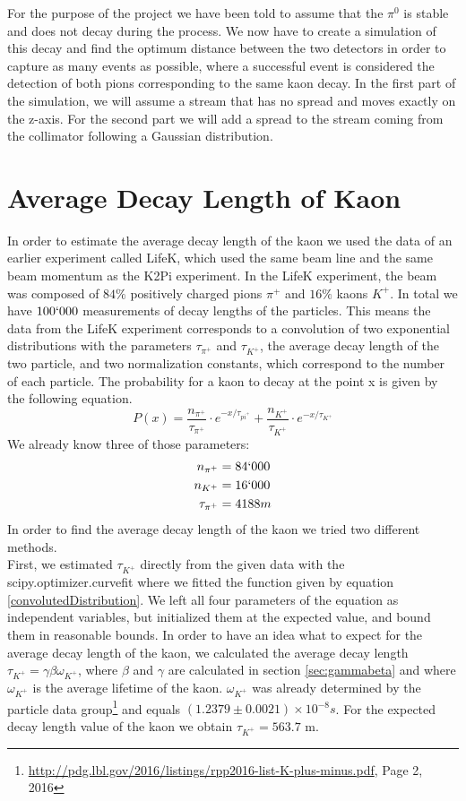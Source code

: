 \documentclass[a4paper,parskip,11pt, DIV12]{scrreprt}
\begin{document}
	For the purpose of the project we have been told to assume that the $\pi^0$ is stable and does not decay during the process. We now have to create a simulation of this decay and find the optimum distance between the two detectors in order to capture as many events as possible, where a successful event is considered the detection of both pions corresponding to the same kaon decay. In the first part of the simulation, we will assume a stream that has no spread and moves exactly on the z-axis. For the second part we will add a spread to the stream coming from the collimator following a Gaussian distribution.
	
	\clearpage
	
	\chapter{Average Decay Length of Kaon}
	
	In order to estimate the average decay length of the kaon we used the data of an earlier experiment called LifeK, which used the same beam line and the same beam momentum as the K2Pi experiment. In the LifeK experiment, the beam was composed of $84\%$ positively charged pions $\pi^+$ and $16\%$ kaons $K^+$. In total we have $100`000$ measurements of decay lengths of the particles. This means the data from the LifeK experiment corresponds to a convolution of two exponential distributions with the parameters $\tau_{\pi^+}$ and $\tau_{K^+}$, the average decay length of the two particle, and two normalization constants, which correspond to the number of each particle. The probability for a kaon to decay at the point x is given by the following equation.
	\begin{equation}
		\label{convolutedDistribution}
		P(x)=  \frac{n_{\pi^+}}{\tau_{\pi^+}} \cdot e^{-x/ \tau_{pi^+}} + \frac{n_{K^+}}{\tau_{K^+}} \cdot e^{-x/ \tau_{K^+}}
	\end{equation} 
	We already know three of those parameters:
	\begin{align*}
		n_{\pi^+} &= 84`000 \\
		n_{K^+} &= 16`000 \\
		\tau_{\pi^+} &= 4188 m
	\end{align*}
	In order to find the average decay length of the kaon we tried two different methods.\\
	First, we estimated $\tau_{K^+}$ directly from the given data with the scipy.optimizer.curvefit where we fitted the function given by equation \ref{convolutedDistribution}. We left all four parameters of the equation as independent variables, but initialized them at the expected value, and bound them in reasonable bounds. In order to have an idea what to expect for the average decay length of the kaon, we calculated the average decay length $\tau_{K^+}= \gamma \beta \omega_{K^+}$, where $\beta$ and $\gamma$ are calculated in section \ref{sec:gammabeta} and where  $\omega_{K^+}$ is the average lifetime of the kaon. $\omega_{K^+}$ was already determined by the particle data group\footnote{\url{http://pdg.lbl.gov/2016/listings/rpp2016-list-K-plus-minus.pdf}, Page 2, 2016} and equals  $(1.2379 \pm 0.0021) \times 10^{-8} s $. For the expected decay length value of the kaon we obtain $\tau_{K^+} = 563.7$ m.
	
\end{document}
